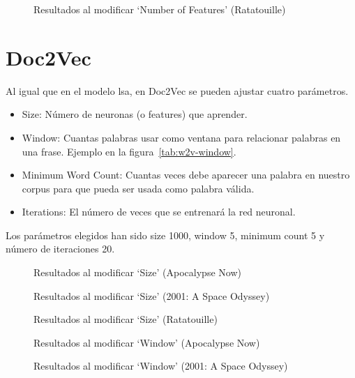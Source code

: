 \documentclass[withindex, glossary]{cam-thesis}
\begin{document}
\begin{figure}[!htbp]
    \centering
    
    \caption{Resultados al modificar `Number of Features' (Ratatouille)}
\end{figure}

\section{Doc2Vec}
Al igual que en el modelo \acrshort{lsa}, en Doc2Vec se pueden ajustar cuatro parámetros.

\begin{itemize}
    \item Size: Número de neuronas (o features) que aprender.
    \item Window: Cuantas palabras usar como ventana para relacionar palabras en una frase. Ejemplo en la figura~\ref{tab:w2v-window}.
    \item Minimum Word Count: Cuantas veces debe aparecer una palabra en nuestro corpus para que pueda ser usada como palabra válida.
    \item Iterations: El número de veces que se entrenará la red neuronal.
\end{itemize}

Los parámetros elegidos han sido size 1000, window 5, minimum count 5 y número de iteraciones 20.

\begin{figure}[!htbp]
    \centering
    
    \caption{Resultados al modificar `Size' (Apocalypse Now)}
\end{figure}

\begin{figure}[!htbp]
    \centering
    
    \caption{Resultados al modificar `Size' (2001: A Space Odyssey)}
\end{figure}

\begin{figure}[!htbp]
    \centering
    
    \caption{Resultados al modificar `Size' (Ratatouille)}
\end{figure}

\begin{figure}[!htbp]
    \centering
    
    \caption{Resultados al modificar `Window' (Apocalypse Now)}
\end{figure}

\begin{figure}[!htbp]
    \centering
    
    \caption{Resultados al modificar `Window' (2001: A Space Odyssey)}
\end{figure}
\end{document}
